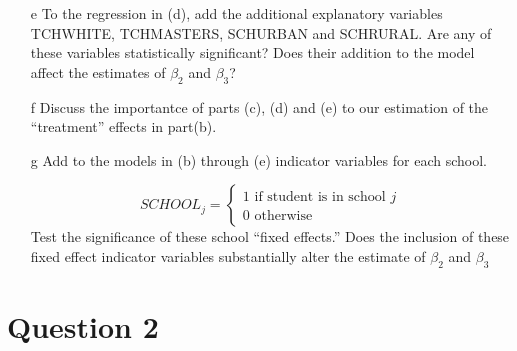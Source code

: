 \documentclass[xcolor={dvipsnames}]{beamer}
\begin{document}
\begin{frame}[allowframebreaks]{7.9}
\begin{itemize}
		\item[e] To the regression in (d), add the additional explanatory variables TCHWHITE, TCHMASTERS, SCHURBAN and SCHRURAL. Are any of these variables statistically significant? Does their addition to the model affect the estimates of $\beta_2$ and $\beta_3$?
		
		\item[f] Discuss the importantce of parts (c), (d) and (e) to our estimation of the ``treatment'' effects in part(b).
		
		\item[g] Add to the models in (b) through (e) indicator variables for each school.
		
		$$SCHOOL_{j} = \begin{cases} 1 \text{ if student is in school } j \\ 0 \text{ otherwise} \end{cases}$$ Test the significance of these school ``fixed effects.'' Does the inclusion of these fixed effect indicator variables substantially alter the estimate of $\beta_2$ and $\beta_3$ 
		
		
	\end{itemize}
	
\end{frame}
	
	
	\section{Question 2}
	
\end{document}
